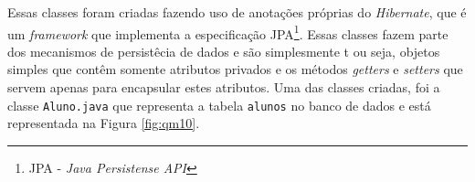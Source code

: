 
	\par Essas classes foram criadas fazendo uso de anotações próprias do
\textit{Hibernate}, que é um \textit{framework} que implementa a especificação
JPA\footnote{JPA - \textit{Java Persistense API}}. Essas classes fazem parte
dos mecanismos de persistêcia de dados e são simplesmente t ou seja, objetos
simples que contêm somente atributos privados e os métodos \textit{getters} e
\textit{setters} que servem apenas para encapsular estes atributos. Uma das
classes criadas, foi a classe \texttt{Aluno.java} que representa a tabela
\texttt{alunos} no banco de dados e está representada na Figura
\ref{fig:qm10}.%
	
